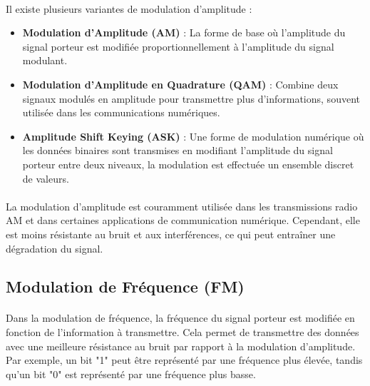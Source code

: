 \documentclass[a4paper,draft,twocolumn]{report}
\begin{document}
\paragraph{}Il existe plusieurs variantes de modulation d'amplitude :
\begin{itemize}
    \item \textbf{Modulation d'Amplitude (AM)} : La forme de base où l'amplitude du signal porteur est modifiée proportionnellement à l'amplitude du signal modulant.
    \item \textbf{Modulation d'Amplitude en Quadrature (QAM)} : Combine deux signaux modulés en amplitude pour transmettre plus d'informations, souvent utilisée dans les communications numériques.
    \item \textbf{Amplitude Shift Keying (ASK)} : Une forme de modulation numérique où les données binaires sont transmises en modifiant l'amplitude du signal porteur entre deux niveaux, la modulation est effectuée un ensemble discret de valeurs.
\end{itemize}
\paragraph{}La modulation d'amplitude est couramment utilisée dans les transmissions radio AM et dans certaines applications de communication numérique. Cependant, elle est moins résistante au bruit et aux interférences, ce qui peut entraîner une dégradation du signal.

\subsection{Modulation de Fréquence (FM)}
\paragraph{}Dans la modulation de fréquence, la fréquence du signal porteur est modifiée en fonction de l'information à transmettre. Cela permet de transmettre des données avec une meilleure résistance au bruit par rapport à la modulation d'amplitude. Par exemple, un bit "1" peut être représenté par une fréquence plus élevée, tandis qu'un bit "0" est représenté par une fréquence plus basse. 
\end{document}
